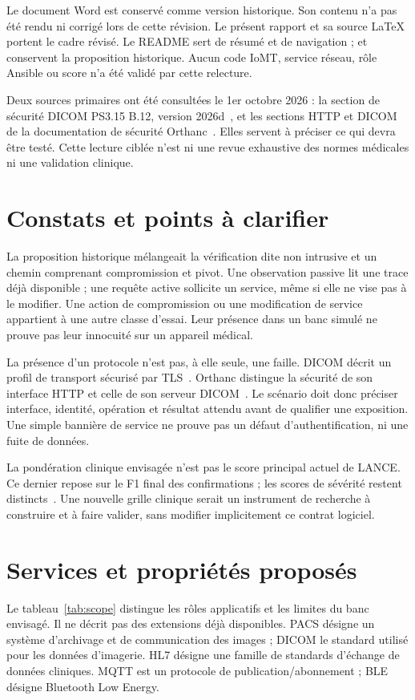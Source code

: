 \documentclass[11pt,a4paper]{article}
\newcommand{\code}[1]{{\small\ttfamily\path{#1}}}
\begin{document}
Le document Word \code{subject.docx} est conservé comme version historique.
Son contenu n'a pas été rendu ni corrigé lors de cette révision. Le présent
rapport et sa source LaTeX portent le cadre révisé. Le README sert de résumé
et de navigation ; \code{subject.md} et \code{subject.docx} conservent la
proposition historique. Aucun code IoMT, service réseau, rôle Ansible ou score
n'a été validé par cette relecture.

Deux sources primaires ont été consultées le 1er octobre 2026 : la section de
sécurité DICOM PS3.15 B.12, version 2026d~\cite{dicom}, et les sections HTTP et
DICOM de la documentation de sécurité Orthanc~\cite{orthanc}. Elles servent à
préciser ce qui devra être testé. Cette lecture ciblée n'est ni une revue
exhaustive des normes médicales ni une validation clinique.

\section{Constats et points à clarifier}
La proposition historique mélangeait la vérification dite non intrusive et
un chemin comprenant compromission et pivot. Une observation passive lit une
trace déjà disponible ; une requête active sollicite un service, même si elle
ne vise pas à le modifier. Une action de compromission ou une modification de
service appartient à une autre classe d'essai. Leur présence dans un banc
simulé ne prouve pas leur innocuité sur un appareil médical.

La présence d'un protocole n'est pas, à elle seule, une faille. DICOM décrit un
profil de transport sécurisé par TLS~\cite{dicom}. Orthanc distingue la sécurité
de son interface HTTP et celle de son serveur DICOM~\cite{orthanc}. Le scénario
doit donc préciser interface, identité, opération et résultat attendu avant de
qualifier une exposition. Une simple bannière de service ne prouve pas un défaut
d'authentification, ni une fuite de données.

La pondération clinique envisagée n'est pas le score principal actuel de LANCE.
Ce dernier repose sur le F1 final des confirmations ; les scores de sévérité
restent distincts~\cite{evaluation}. Une nouvelle grille clinique serait un
instrument de recherche à construire et à faire valider, sans modifier
implicitement ce contrat logiciel.

\section{Services et propriétés proposés}
Le tableau~\ref{tab:scope} distingue les rôles applicatifs et les limites du
banc envisagé. Il ne décrit pas des extensions déjà disponibles.
PACS désigne un système d'archivage et de communication des images ; DICOM le
standard utilisé pour les données d'imagerie. HL7 désigne une famille de standards
d'échange de données cliniques. MQTT est un protocole de publication/abonnement ;
BLE désigne Bluetooth Low Energy.
\end{document}
